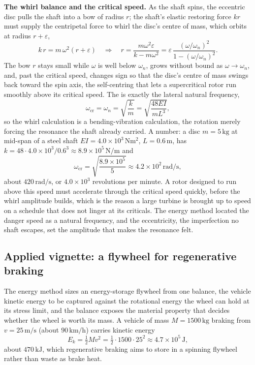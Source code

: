 \textbf{The whirl balance and the critical speed.} As the shaft spins, the
eccentric disc pulls the shaft into a bow of radius $r$; the shaft's elastic
restoring force $kr$ must supply the centripetal force to whirl the disc's
centre of mass, which orbits at radius $r + \varepsilon$,
\[
k\,r = m\,\omega^2 (r + \varepsilon)
\quad\Longrightarrow\quad
r = \frac{m\omega^2\varepsilon}{k - m\omega^2}
= \varepsilon\,\frac{(\omega/\omega_n)^2}{1 - (\omega/\omega_n)^2}.
\]
The bow $r$ stays small while $\omega$ is well below $\omega_n$, grows
without bound as $\omega\to\omega_n$, and, past the critical speed, changes
sign so that the disc's centre of mass swings back toward the spin axis, the
self-centring that lets a supercritical rotor run smoothly above its
critical speed. The  is exactly the lateral
natural frequency,
\[
\omega_{\mathrm{cr}} = \omega_n = \sqrt{\frac{k}{m}}
= \sqrt{\frac{48EI}{mL^3}},
\]
so the whirl calculation is a bending-vibration calculation, the rotation
merely forcing the resonance the shaft already carried. A number: a disc
$m = 5\,\si{\kilogram}$ at mid-span of a steel shaft $EI = 4.0\times 10^{3}\,
\si{\newton\meter\squared}$, $L = 0.6\,\si{\meter}$, has $k = 48\cdot 4.0
\times 10^{3}/0.6^3 \approx 8.9\times 10^{5}\,\si{\newton\per\meter}$ and
\[
\omega_{\mathrm{cr}} = \sqrt{\frac{8.9\times 10^{5}}{5}}
\approx 4.2\times 10^{2}\,\si{\radian\per\second},
\]
about $420\,\si{\radian\per\second}$, or $4.0\times 10^{3}$ revolutions per
minute. A rotor designed to run above this speed must accelerate through the
critical speed quickly, before the whirl amplitude builds, which is the
reason a large turbine is brought up to speed on a schedule that does not
linger at its criticals. The energy method located the danger speed as a
natural frequency, and the eccentricity, the imperfection no shaft escapes,
set the amplitude that makes the resonance felt.

\subsection{Applied vignette: a flywheel for regenerative braking}

The energy method sizes an energy-storage flywheel from one balance, the
vehicle kinetic energy to be captured against the rotational energy the wheel
can hold at its stress limit, and the balance exposes the material property
that decides whether the wheel is worth its mass. A vehicle of mass $M =
1500\,\si{\kilogram}$ braking from $v = 25\,\si{\meter\per\second}$ (about
$90\,\si{\kilo\meter\per\hour}$) carries kinetic energy
\[
E_k = \tfrac12 M v^2 = \tfrac12\cdot 1500\cdot 25^2
\approx 4.7\times 10^{5}\,\si{\joule},
\]
about $470\,\si{\kilo\joule}$, which regenerative braking aims to store in a
spinning flywheel rather than waste as brake heat.

